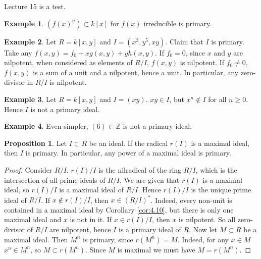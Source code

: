 \documentclass{article}
\newcommand{\Z}{\mathbb{Z}}
\newcommand{\rb}[1]{\left( #1 \right)}
\renewcommand{\sb}[1]{\left[ #1 \right]}
\theoremstyle{definition}\newtheorem{definition}{Definition}[section]
\theoremstyle{definition}\newtheorem{remark}[definition]{Remark}
\theoremstyle{definition}\newtheorem*{example}{Example}
\theoremstyle{definition}\newtheorem*{note}{Note}
\newtheorem{proposition}[definition]{Proposition}
\begin{document}

Lecture 15 is a test.


\begin{example}
$ \rb{f\rb{x}^n} \subset k\sb{x} $ for $ f\rb{x} $ irreducible is primary.
\end{example}

\begin{example}
Let $ R = k\sb{x, y} $ and $ I = \rb{x^3, y^5, xy} $. Claim that $ I $ is primary. Take any $ f\rb{x, y} = f_0 + xg\rb{x, y} + yh\rb{x, y} $. If $ f_0 = 0 $, since $ x $ and $ y $ are nilpotent, when considered as elements of $ R / I $, $ f\rb{x, y} $ is nilpotent. If $ f_0 \ne 0 $, $ f\rb{x, y} $ is a sum of a unit and a nilpotent, hence a unit. In particular, any zero-divisor in $ R / I $ is nilpotent.
\end{example}

\begin{example}
Let $ R = k\sb{x, y} $ and $ I = \rb{xy} $. $ xy \in I $, but $ x^n \notin I $ for all $ n \ge 0 $. Hence $ I $ is not a primary ideal.
\end{example}

\begin{example}
Even simpler, $ \rb{6} \subset \Z $ is not a primary ideal.
\end{example}

\begin{proposition}
Let $ I \subset R $ be an ideal. If the radical $ r\rb{I} $ is a maximal ideal, then $ I $ is primary. In particular, any power of a maximal ideal is primary.
\end{proposition}

\begin{proof}
Consider $ R / I $. $ r\rb{I} / I $ is the nilradical of the ring $ R / I $, which is the intersection of all prime ideals of $ R / I $. We are given that $ r\rb{I} $ is a maximal ideal, so $ r\rb{I} / I $ is a maximal ideal of $ R / I $. Hence $ r\rb{I} / I $ is the unique prime ideal of $ R / I $. If $ x \notin r\rb{I} / I $, then $ x \in \rb{R / I}^* $. Indeed, every non-unit is contained in a maximal ideal by Corollary \ref{cor:4.10}, but there is only one maximal ideal and $ x $ is not in it. If $ x \in r\rb{I} / I $, then $ x $ is nilpotent. So all zero-divisor of $ R / I $ are nilpotent, hence $ I $ is a primary ideal of $ R $. Now let $ M \subset R $ be a maximal ideal. Then $ M^n $ is primary, since $ r\rb{M^n} = M $. Indeed, for any $ x \in M $ $ x^n \in M^n $, so $ M \subset r\rb{M^n} $. Since $ M $ is maximal we must have $ M = r\rb{M^n} $.
\end{proof}
\end{document}

